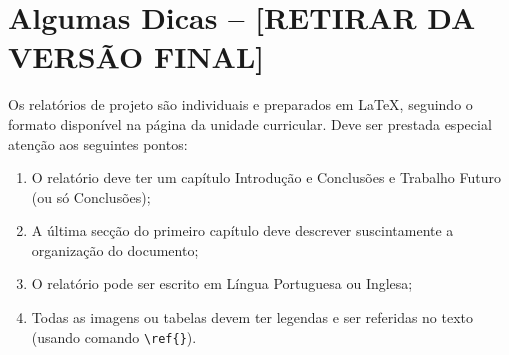 \section{Algumas Dicas -- [RETIRAR DA VERSÃO FINAL]}
Os relatórios de projeto são individuais e preparados em \LaTeX, seguindo o formato disponível na página da unidade curricular. Deve ser prestada especial atenção aos seguintes pontos:
\begin{enumerate}
  \item O relatório deve ter um capítulo Introdução e Conclusões e Trabalho Futuro (ou só Conclusões);
  \item A última secção do primeiro capítulo deve descrever suscintamente a organização do documento;
  \item O relatório pode ser escrito em Língua Portuguesa ou Inglesa;
  \item Todas as imagens ou tabelas devem ter legendas e ser referidas no texto (usando comando \texttt{\textbackslash ref\{\}}).
\end{enumerate}